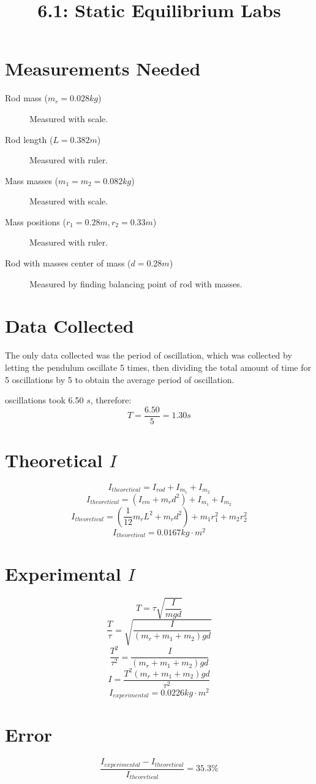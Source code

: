 \documentclass{article}
\title{6.1: Static Equilibrium Labs}
\begin{document}
\section{Measurements Needed}
\begin{description}
    \item[Rod mass ($m_r = 0.028 kg$)] Measured with scale.
    \item[Rod length ($L = 0.382 m$)] Measured with ruler.
    \item[Mass masses ($m_1 = m_2 = 0.082 kg$)] Measured with scale.
    \item[Mass positions ($r_1 = 0.28 m, r_2 = 0.33 m$)] Measured with ruler.
    \item[Rod with masses center of mass ($d = 0.28 m$)] Measured by finding balancing point of rod with masses.
\end{description}
\section{Data Collected}
The only data collected was the period of oscillation, which was collected by letting the pendulum oscillate 5 times, then dividing the total amount of time for 5 oscillations by 5 to obtain the average period of oscillation.

 oscillations took 6.50 $s$, therefore:
\[T = \frac{6.50}{5} = 1.30 s\]
\section{Theoretical $I$}
\[I_{theoretical} = I_{rod} + I_{m_1} + I_{m_2}\]
\[I_{theoretical} = (I_{cm} + m_rd^2) + I_{m_1} + I_{m_2}\]
\[I_{theoretical} = (\frac{1}{12}m_rL^2 + m_rd^2) + m_1r_1^2 + m_2r_2^2\]
\[I_{theoretical} = 0.0167 kg \cdot m^2\]
\section{Experimental $I$}
\[T = \tau\sqrt{\frac{I}{mgd}}\]
\[\frac{T}{\tau} = \sqrt{\frac{I}{(m_r + m_1 + m_2)gd}}\]
\[\frac{T^2}{\tau^2} = \frac{I}{(m_r + m_1 + m_2)gd}\]
\[I = \frac{T^2(m_r + m_1 + m_2)gd}{\tau^2}\]
\[I_{experimental} = 0.0226 kg \cdot m^2\]
\section{Error}
\[\frac{I_{experimental} - I_{theoretical}}{I_{theoretical}} = 35.3\%\]
\end{document}
